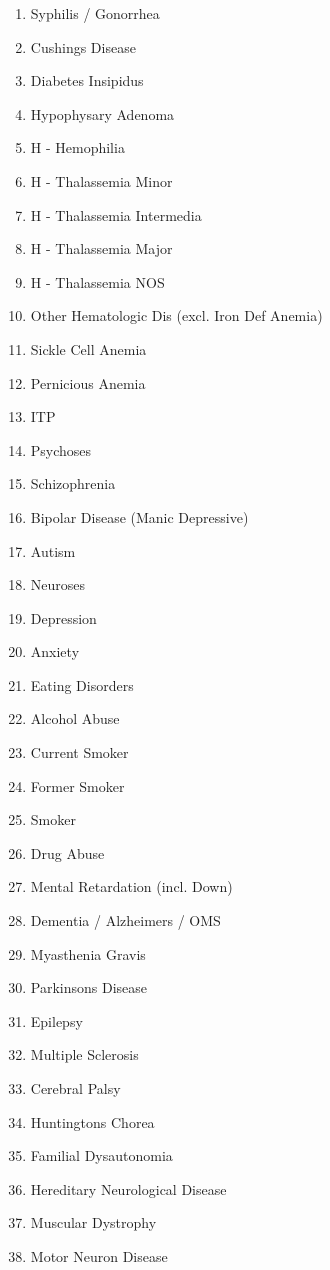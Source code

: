 \documentclass[a4paper,12pt]{article}
\begin{document}
\begin{appendices}
\begin{enumerate}
   			\item Syphilis / Gonorrhea
   			\item Cushings Disease
   			\item Diabetes Insipidus
   			\item Hypophysary Adenoma
   			\item H - Hemophilia
   			\item H - Thalassemia Minor
   			\item H - Thalassemia Intermedia
   			\item H - Thalassemia Major
   			\item H - Thalassemia NOS
   			\item Other Hematologic Dis (excl. Iron Def Anemia)
   			\item Sickle Cell Anemia
   			\item Pernicious Anemia
   			\item ITP
   			\item Psychoses
   			\item Schizophrenia
   			\item Bipolar Disease (Manic Depressive)
   			\item Autism
   			\item Neuroses
   			\item Depression
   			\item Anxiety
   			\item Eating Disorders
   			\item Alcohol Abuse
   			\item Current Smoker
   			\item Former Smoker
   			\item Smoker
   			\item Drug Abuse
   			\item Mental Retardation (incl. Down)
   			\item Dementia / Alzheimers / OMS
   			\item Myasthenia Gravis
   			\item Parkinsons Disease
   			\item Epilepsy
   			\item Multiple Sclerosis
   			\item Cerebral Palsy
   			\item Huntingtons Chorea
   			\item Familial Dysautonomia
   			\item Hereditary Neurological Disease
   			\item Muscular Dystrophy
   			\item Motor Neuron Disease

\end{enumerate}
\end{appendices}
\end{document}
